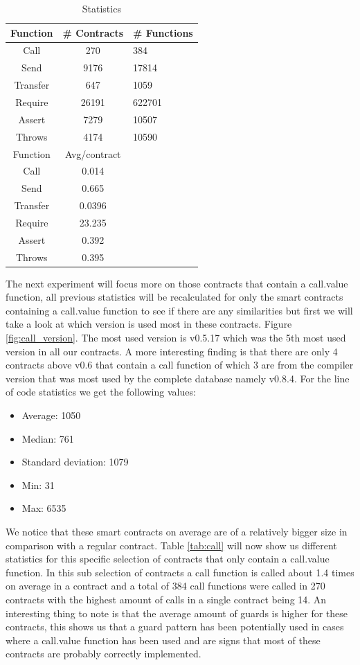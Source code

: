 \documentclass[sigconf]{acmart}
\begin{document}
\begin{table}
  \caption{Statistics}
  \label{tab:stats}
  \begin{tabular}{ccl}
    \toprule
    Function & \# Contracts & \# Functions\\
    \midrule
    Call&270&384\\
    Send&9176&17814\\
    Transfer&647&1059\\
    Require&26191&622701\\
    Assert&7279&10507\\
    Throws&4174&10590\\
    \toprule
    Function & Avg/contract\\
    \midrule
    Call&0.014\\
    Send&0.665\\
    Transfer&0.0396\\
    Require&23.235\\
    Assert&0.392\\
    Throws&0.395\\
  \bottomrule
\end{tabular}
\end{table}
The next experiment will focus more on those contracts that contain a call.value function, all previous statistics will be recalculated for only the smart contracts containing a call.value function to see if there are any similarities but first we will take a look at which version is used most in these contracts.
Figure \ref{fig:call_version}. The most used version is v0.5.17 which was the 5th most used version in all our contracts. A more interesting finding is that there are only 4 contracts above v0.6 that contain a call function of which 3 are from the compiler version that was most used by the complete database namely v0.8.4. For the line of code statistics we get the following values:
\begin{itemize}
    \item Average: 1050
    \item Median: 761
    \item Standard deviation: 1079
    \item Min: 31
    \item Max: 6535
\end{itemize}
We notice that these smart contracts on average are of a relatively bigger size in comparison with a regular contract.
Table \ref{tab:call} will now show us different statistics for this specific selection of contracts that only contain a call.value function. In this sub selection of contracts a call function is called about 1.4 times on average in a contract and a total of 384 call functions were called in 270 contracts with the highest amount of calls in a single contract being 14. An interesting thing to note is that the average amount of guards is higher for these contracts, this shows us that a guard pattern has been potentially used in cases where a call.value function has been used and are signs that most of these contracts are probably correctly implemented. 
\end{document}
